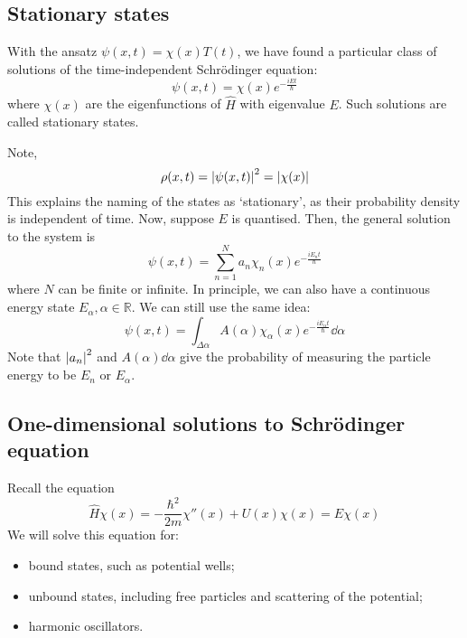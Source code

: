 \subsection{Stationary states}
\begin{definition}
	With the ansatz \( \psi(x,t) = \chi(x) T(t) \), we have found a particular class of solutions of the time-independent Schr\"odinger equation:
	\[
		\psi(x,t) = \chi(x) e^{-\frac{i E t}{\hbar}}
	\]
	where \( \chi(x) \) are the eigenfunctions of \( \hat H \) with eigenvalue \( E \).
	Such solutions are called stationary states.
\end{definition}
\noindent Note,
\[
	\rho(x,t) = \abs{\psi(x,t)}^2 = \abs{\chi(x)}
\]
This explains the naming of the states as `stationary', as their probability density is independent of time.
Now, suppose \( E \) is quantised.
Then, the general solution to the system is
\[
	\psi(x,t) = \sum_{n=1}^N a_n \chi_n(x) e^{-\frac{iE_n t}{\hbar}}
\]
where \( N \) can be finite or infinite.
In principle, we can also have a continuous energy state \( E_\alpha, \alpha \in \mathbb R \).
We can still use the same idea:
\[
	\psi(x,t) = \int_{\Delta \alpha} A(\alpha) \chi_\alpha(x) e^{-\frac{iE_\alpha t}{\hbar}} \dd{\alpha}
\]
Note that \( \abs{a_n}^2 \) and \( A(\alpha) \dd{\alpha} \) give the probability of measuring the particle energy to be \( E_n \) or \( E_\alpha \).

\subsection{One-dimensional solutions to Schr\"odinger equation}
Recall the equation
\[
	\hat H \chi(x) = -\frac{\hbar^2}{2m} \chi''(x) + U(x) \chi(x) = E \chi(x)
\]
We will solve this equation for:
\begin{itemize}
	\item bound states, such as potential wells;
	\item unbound states, including free particles and scattering of the potential;
	\item harmonic oscillators.
\end{itemize}

